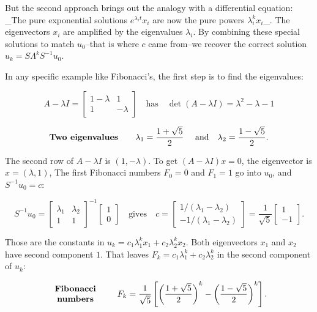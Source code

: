 But the second approach brings out the analogy with a differential equation: _The pure exponential solutions \(e^{\lambda_{i}t}x_{i}\) are now the pure powers \(\lambda_{i}^{k}x_{i}\)_. The eigenvectors \(x_{i}\) are amplified by the eigenvalues \(\lambda_{i}\). By combining these special solutions to match \(u_{0}\)--that is where \(c\) came from--we recover the correct solution \(u_{k}=S\Lambda^{k}S^{-1}u_{0}\).

In any specific example like Fibonacci's, the first step is to find the eigenvalues:

\[A-\lambda I=\begin{bmatrix}1-\lambda&1\\ 1&-\lambda\end{bmatrix}\quad\text{has}\quad\det(A-\lambda I)=\lambda^{2}- \lambda-1\]

\[\text{\bf Two eigenvalues}\qquad\lambda_{1}=\frac{1+\sqrt{5}}{2}\quad\text{ and}\quad\lambda_{2}=\frac{1-\sqrt{5}}{2}.\]

The second row of \(A-\lambda I\) is \((1,-\lambda)\). To get \((A-\lambda I)x=0\), the eigenvector is \(x=(\lambda,1)\), The first Fibonacci numbers \(F_{0}=0\) and \(F_{1}=1\) go into \(u_{0}\), and \(S^{-1}u_{0}=c\):

\[S^{-1}u_{0}=\begin{bmatrix}\lambda_{1}&\lambda_{2}\\ 1&1\end{bmatrix}^{-1}\begin{bmatrix}1\\ 0\end{bmatrix}\quad\text{gives}\quad c=\begin{bmatrix}1/(\lambda_{1}-\lambda_{ 2})\\ -1/(\lambda_{1}-\lambda_{2})\end{bmatrix}=\frac{1}{\sqrt{5}}\begin{bmatrix}1\\ -1\end{bmatrix}.\]

Those are the constants in \(u_{k}=c_{1}\lambda_{1}^{k}x_{1}+c_{2}\lambda_{2}^{k}x_{2}\). Both eigenvectors \(x_{1}\) and \(x_{2}\) have second component \(1\). That leaves \(F_{k}=c_{1}\lambda_{1}^{k}+c_{2}\lambda_{2}^{k}\) in the second component of \(u_{k}\):

\[\begin{array}{c}\text{\bf Fibonacci}\\ \text{\bf numbers}\end{array}\qquad F_{k}=\frac{1}{\sqrt{5}}\left[\left( \frac{1+\sqrt{5}}{2}\right)^{k}-\left(\frac{1-\sqrt{5}}{2}\right)^{k}\right].\]

